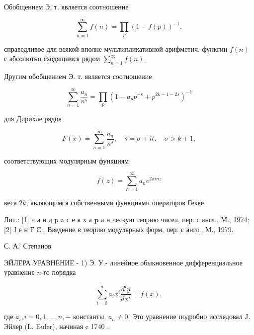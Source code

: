 \documentclass[10pt]{article}
\begin{document}
Обобщением Э. т. является соотношение



\[

\sum_{n=1}^{\infty} f(n)=\prod_{p}(1-f(p))^{-1},

\]



справедливое для всякой вполне мультипликативной арифметич. функгии $f(n)$ с абсолютно сходящимся рядом $\sum_{n=1}^{\infty} f(n)$.



Другим обобщением Э. т. является соотношение



\[

\sum_{n=1}^{\infty} \frac{a_{n}}{n^{s}}=\prod_{p}\left(1-a_{p} p^{-s}+p^{2 k-1-2 s}\right)^{-1}

\]



для Дирихле рядов



\[

F(x)=\sum_{n=1}^{\infty} \frac{a_{n}}{n^{s}}, \quad s=\sigma+i t, \quad \sigma>k+1,

\]



соответствующих модулярным функциям



\[

f(z)=\sum_{n=1}^{\infty} a_{n} e^{2 \pi i n z}

\]



веса $2 k$, являющимся собственными функциями операторов Гекке.



Лит.: [1] ч а н д $\mathrm{p}$ a с е к х а $\mathbf{p}$ а н ческую теорию чисел, пер. с англ., М., 1974; [2] Ј е н Г С., Введение в теорию модулярных форм, пер. с англ., М., 1979.



С. А.' Степанов



ЭЙЛЕРА УРАВНЕНИЕ - 1) Э. У.- линейное обыкновенное дифференциальное уравнение $n$-го порядка



\[

\sum_{i=0}^{n} a_{i} x^{i} \frac{d^{i} y}{d x^{i}}=f(x),

\]



где $a_{i}, i=0,1, \ldots, n,-$ константы, $a_{n} \neq 0$. Это уравнение подробно исследовал J. Эйлер (L. Euler), начиная c 1740 .
\end{document}
